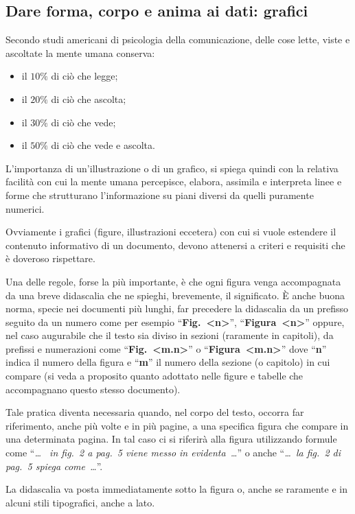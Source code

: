 				\subsection{Dare forma, corpo e anima ai dati: grafici}

Secondo studi americani di psicologia della comunicazione, delle cose lette, viste e ascoltate la mente umana conserva:
\begin{itemize}
 \item il $10\%$ di ciò che legge;
 \item il $20\%$ di ciò che ascolta;
 \item il $30\%$ di ciò che vede;
 \item il $50\%$ di ciò che vede e ascolta.
\end{itemize}

L'importanza di un'illustrazione o di un grafico, si spiega quindi con la relativa facilità con cui la mente umana percepisce, elabora, assimila e interpreta linee e forme che strutturano l'informazione su piani diversi da quelli puramente numerici.

Ovviamente i grafici (figure, illustrazioni eccetera) con cui si vuole estendere il contenuto informativo di un documento, devono attenersi a criteri e requisiti che è doveroso rispettare.

Una delle regole, forse la più importante, è che ogni figura venga accompagnata da una breve didascalia che ne spieghi, brevemente, il significato. È anche buona norma, specie nei documenti più lunghi, far precedere la didascalia da un prefisso seguito da un numero come per esempio    ``\textbf{Fig.~<n>}'', ``\textbf{Figura~<n>}'' oppure, nel caso augurabile che il testo sia diviso in sezioni (raramente in capitoli), da prefissi e numerazioni come ``\textbf{Fig.~<m.n>}'' o ``\textbf{Figura~<m.n>}'' dove ``\textbf{n}'' indica il numero della figura e ``\textbf{m}'' il numero della sezione (o capitolo) in cui compare (si veda a proposito quanto adottato nelle figure e tabelle che accompagnano questo stesso documento).

Tale pratica diventa necessaria quando, nel corpo del testo, occorra far riferimento, anche più volte e in più pagine, a una specifica figura che compare in una determinata pagina. In tal caso ci si riferirà alla figura utilizzando formule come ``\textit{\ldots~ in fig.~2 a pag.~5 viene messo in evidenta~\ldots}'' o anche ``\textit{\ldots~la fig.~2 di pag.~5 spiega come~\ldots}''.

La didascalia va posta immediatamente sotto la figura o, anche se raramente e in alcuni stili tipografici, anche a lato.

